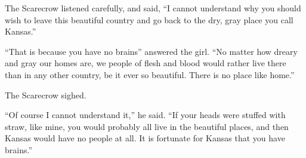 \documentclass{article}
\begin{document}
The Scarecrow listened carefully, and said, ``{\ITP I cannot understand why
you should wish to leave this beautiful country and go back to the dry,
gray place you call Kansas.}''

``That is because you have no brains'' answered the girl. ``{\ITP No matter
how dreary and gray our homes are, we people of flesh and blood would
rather live there than in any other country, be it ever so beautiful.
There is no place like home.}''

The Scarecrow sighed.

``Of course I cannot understand it,'' he said. ``{\ITP If your heads were
stuffed with straw, like mine, you would probably all live in the
beautiful places, and then Kansas would have no people at all. It is
fortunate for Kansas that you have brains.}'' 
\end{document}

